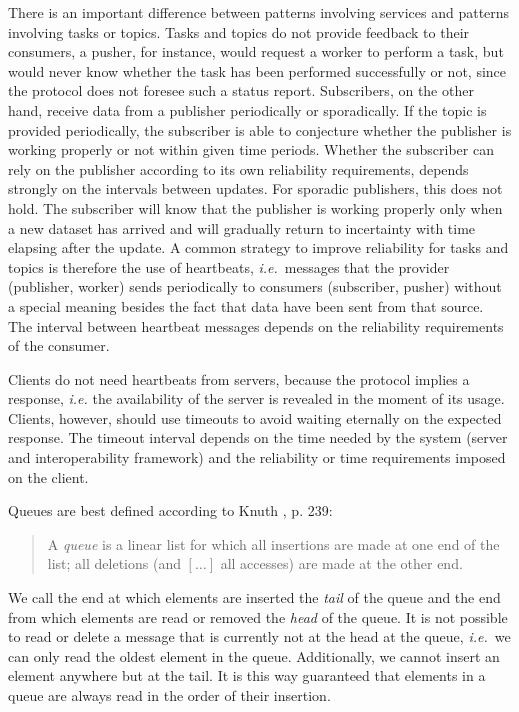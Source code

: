 \documentclass[a4paper]{scrartcl}
\newcommand\ie{\textit{i.e.}}
\newcommand{\term}[1]{\emph{#1}}
\begin{document}
There is an important difference between patterns
involving services and patterns involving tasks or topics.
Tasks and topics do not provide feedback to their consumers,
a pusher, for instance, would request a worker to perform a task,
but would never know whether the task has been performed
successfully or not, since the protocol
does not foresee such a status report.
Subscribers, on the other hand, receive data from a publisher
periodically or sporadically.
If the topic is provided periodically,
the subscriber is able to conjecture 
whether the publisher is working properly or not
within given time periods.
Whether the subscriber can rely on the publisher
according to its own reliability requirements,
depends strongly on the intervals between updates.
For sporadic publishers, this does not hold.
The subscriber will know that the publisher is working properly
only when a new dataset has arrived and will gradually return
to incertainty with time elapsing after the update.
A common strategy to improve reliability for tasks and topics
is therefore the use of heartbeats, 
\ie\ messages that 
the provider (publisher, worker) sends periodically 
to consumers (subscriber, pusher)
without a special meaning besides the fact
that data have been sent from that source.
The interval between heartbeat messages
depends on the reliability requirements of the consumer.

Clients do not need heartbeats from servers,
because the protocol implies a response, \ie
the availability of the server is revealed in the moment
of its usage.
Clients, however, should use timeouts
to avoid waiting eternally on the expected response.
The timeout interval depends on the time needed by the system
(server and interoperability framework)
and the reliability or time requirements
imposed on the client.

Queues are best defined according to Knuth \cite{Knuth97}, p. 239:

\begin{quote}
A \emph{queue} is a linear list for which all insertions
are made at one end of the list; all deletions (and $[\dots]$
all accesses) are made at the other end.
\end{quote}

We call the end at which elements are inserted
the \term{tail} of the queue
and the end from which elements are read or removed
the \term{head} of the queue.
It is not possible to read or delete a message
that is currently not at the head at the queue,
\ie\ we can only read the oldest element in the queue.
Additionally, we cannot insert an element anywhere
but at the tail.
It is this way guaranteed
that elements in a queue are always read in the order
of their insertion.
\end{document}
